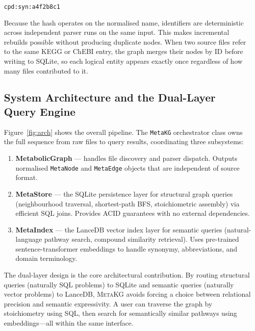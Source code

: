 \documentclass[10pt]{article}
\begin{document}
\begin{center}
\texttt{cpd:syn:a4f2b8c1}
\end{center}

Because the hash operates on the normalised name, identifiers are
deterministic across independent parser runs on the same input. This makes
incremental rebuilds possible without producing duplicate nodes. When two
source files refer to the same KEGG or ChEBI entry, the graph merges their
nodes by ID before writing to SQLite, so each logical entity appears exactly
once regardless of how many files contributed to it.

\subsection{System Architecture and the Dual-Layer Query Engine}

Figure~\ref{fig:arch} shows the overall pipeline. The \texttt{MetaKG}
orchestrator class owns the full sequence from raw files to query results,
coordinating three subsystems:

\begin{enumerate}[leftmargin=*]
  \item \textbf{MetabolicGraph} --- handles file discovery and parser
    dispatch. Outputs normalised \texttt{MetaNode} and \texttt{MetaEdge}
    objects that are independent of source format.
  \item \textbf{MetaStore} --- the SQLite persistence layer for structural
    graph queries (neighbourhood traversal, shortest-path BFS, stoichiometric
    assembly) via efficient SQL joins. Provides ACID guarantees with no
    external dependencies.
  \item \textbf{MetaIndex} --- the LanceDB vector index layer for semantic
    queries (natural-language pathway search, compound similarity retrieval).
    Uses pre-trained sentence-transformer embeddings to handle synonymy,
    abbreviations, and domain terminology.
\end{enumerate}

The dual-layer design is the core architectural contribution. By routing
structural queries (naturally SQL problems) to SQLite and semantic queries
(naturally vector problems) to LanceDB, \textsc{MetaKG} avoids forcing a
choice between relational precision and semantic expressivity. A user can
traverse the graph by stoichiometry using SQL, then search for semantically
similar pathways using embeddings---all within the same interface.
\end{document}
